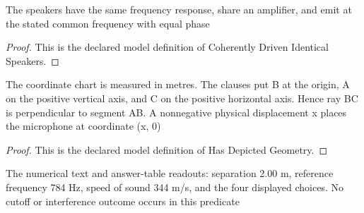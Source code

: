 \begin{definition}
  \label{def:physics:phyx-mini-0173:phyxminiproblems-problemphyxmini0173-coherentlydrivenidenticalspeakers}
  The speakers have the same frequency response, share an amplifier, and emit at the stated common frequency with equal phase
\end{definition}
\begin{proof}
  This is the declared model definition of Coherently Driven Identical Speakers.
\end{proof}
\begin{definition}
  \label{def:physics:phyx-mini-0173:phyxminiproblems-problemphyxmini0173-hasdepictedgeometry}
  The coordinate chart is measured in metres. The clauses put B at the origin, A on the positive vertical axis, and C on the positive horizontal axis. Hence ray BC is perpendicular to segment AB. A nonnegative physical displacement x places the microphone at coordinate (x, 0)
\end{definition}
\begin{proof}
  This is the declared model definition of Has Depicted Geometry.
\end{proof}
\begin{definition}
  \label{def:physics:phyx-mini-0173:phyxminiproblems-problemphyxmini0173-hasstatedreadouts}
  The numerical text and answer-table readouts: separation 2.00 m, reference frequency 784 Hz, speed of sound 344 m/s, and the four displayed choices. No cutoff or interference outcome occurs in this predicate
\end{definition}
